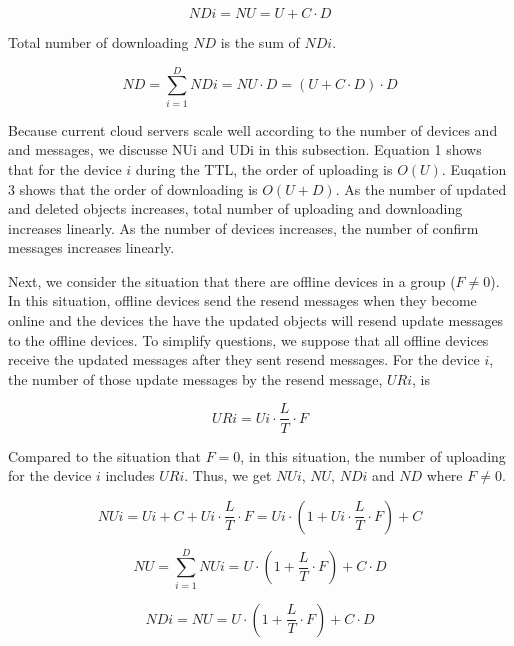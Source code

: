 \documentclass[twocolumn,10pt]{article}
\begin{document}
\begin{equation}
NDi = NU = U + C \cdot D
\end{equation}

Total number of downloading $ND$ is the sum of $NDi$.

\begin{equation}
ND = \sum_{i=1}^{D} NDi = NU \cdot D =  (U + C \cdot D) \cdot D
\end{equation}

Because current cloud servers scale well according to the number of devices and and messages, we discusse NUi and UDi in this subsection.
Equation 1 shows that for the device $i$ during the TTL, the order of uploading  is $O(U)$.
Euqation 3 shows that the order of downloading is $O(U+D)$.
As the number of updated and deleted objects increases, total number of uploading and downloading increases linearly.
As the number of devices increases, the number of confirm messages increases linearly.

Next, we consider the situation that there are offline devices in a group ($F \neq 0$).
In this situation, offline devices send the resend messages when they become online and the devices the have the updated objects will resend update messages to the offline devices.
To simplify questions, we suppose that all offline devices receive the updated messages after they sent resend messages.
For the device $i$, the number of those update messages by the resend message, $URi$, is

\begin{equation}
URi = Ui \cdot \frac{L}{T} \cdot F
\end{equation}

Compared to the situation that $F=0$, in this situation, the number of uploading for the device $i$ includes $URi$.
Thus, we get $NUi$, $NU$, $NDi$ and $ND$ where $F \neq 0$.

\begin{equation}
NUi = Ui + C + Ui \cdot \frac{L}{T} \cdot F = Ui \cdot (1 + Ui \cdot \frac{L}{T} \cdot F) + C
\end{equation}

\begin{equation}
NU = \sum_{i=1}^{D} NUi = U \cdot (1 + \frac{L}{T} \cdot F) + C \cdot D
\end{equation}

\begin{equation}
NDi = NU = U \cdot (1 + \frac{L}{T} \cdot F) + C \cdot D
\end{equation}
\end{document}
